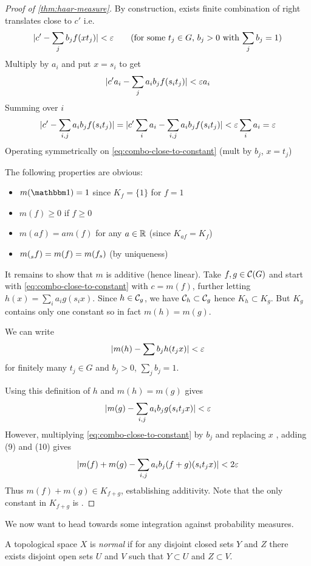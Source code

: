 \begin{proof}[Proof of \cref{thm:haar-measure}]
  By construction, exists finite combination of right translates close
  to $c'$ i.e.
  \begin{align}
    \label{eq:combo-close-to-constant}
    \lvert c' - \sum_j b_j f(x t_j) \rvert < \varepsilon
    \qquad(\text{for some $t_j \in G$, $b_j > 0$ with $\sum_j b_j = 1$})
  \end{align}
  Multiply by $a_i$ and put $x = s_i$ to get
  \[
    \lvert c' a_i - \sum_j a_i b_j f(s_i t_j) \rvert < \varepsilon a_i
  \]
  Summing over $i$
  \[
    \lvert c' - \sum_{i, j} a_i b_j f(s_i t_j) \rvert
    = \lvert c' \sum_i a_i - \sum_{i,j} a_i b_j f(s_i t_j) \rvert
    < \varepsilon \sum_i a_i
    = \varepsilon
  \]
  Operating symmetrically on \cref{eq:combo-close-to-constant}
  (mult by $b_j$, $x = t_j$) 

  The following properties are obvious:
  \begin{itemize}
    \item $m(\ind)= 1$ since $K_f = \{1\}$ for $f=1$
    \item $m(f) \geq 0$ if $f \geq 0$
    \item $m(a f) = a m(f)$ for any $a \in \mathbb{R}$ (since $K_{af} = K_f$)
    \item $m(\prescript{}{s}{f}) = m(f) = m(f_s)$ (by uniqueness)
  \end{itemize}
  It remains to show that $m$ is additive (hence linear). Take $f,g \in \mathcal{C}(G)$
  and start with \cref{eq:combo-close-to-constant} with $c = m(f)$, further
  letting $h(x) = \sum_i a_i g(s_i x)$. Since $h \in \mathcal{C}_g$, we have $\mathcal{C}_h
  \subset \mathcal{C}_g$ hence $K_h \subset K_g$. But $K_g$ contains only one constant
  so in fact $m(h) = m(g)$.

  We can write
  \[
    \lvert m(h) - \sum b_j h(t_j x) \rvert < \varepsilon
  \]
  for finitely many $t_j \in G$ and $b_j > 0$, $\sum_j b_j = 1$.

  Using this definition of $h$ and $m(h) = m(g)$ gives
  \[
    \lvert m(g) - \sum_{i,j} a_i b_j g(s_i t_j x) \rvert < \varepsilon
  \]
  However, multiplying \cref{eq:combo-close-to-constant} by $b_j$
  and replacing $x$ \todo{}, adding (9) and (10) gives
  \[
    \lvert m(f) + m(g) - \sum_{i,j} a_i b_j (f + g) (s_i t_j x) \rvert < 2 \varepsilon
  \]
  Thus $m(f) + m(g) \in K_{f+g}$, establishing additivity.
  Note that the only constant in $K_{f+g}$ is .
\end{proof}

We now want to head towards some integration against probability measures.

\begin{definition}
  A topological space $X$ is \emph{normal} if for any disjoint closed
  sets $Y$ and $Z$ there exists disjoint open sets $U$ and $V$
  such that $Y \subset U$ and $Z \subset V$.
\end{definition}

